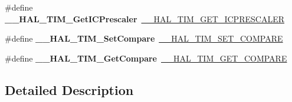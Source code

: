 \begin{DoxyCompactItemize}
\item 
\hypertarget{group___h_a_l___t_i_m___aliased___macros_gae8d82e4e04e81f7a023a45b73c9705b7}{\#define {\bfseries \-\_\-\-\_\-\-H\-A\-L\-\_\-\-T\-I\-M\-\_\-\-Get\-I\-C\-Prescaler}~\hyperlink{group___t_i_m___exported___macros_gabfeec6b3c67a5747c7dbd20aff61d8e2}{\-\_\-\-\_\-\-H\-A\-L\-\_\-\-T\-I\-M\-\_\-\-G\-E\-T\-\_\-\-I\-C\-P\-R\-E\-S\-C\-A\-L\-E\-R}}\label{group___h_a_l___t_i_m___aliased___macros_gae8d82e4e04e81f7a023a45b73c9705b7}

\item 
\hypertarget{group___h_a_l___t_i_m___aliased___macros_ga03feb77e8c86f3563d671c1ec2439e76}{\#define {\bfseries \-\_\-\-\_\-\-H\-A\-L\-\_\-\-T\-I\-M\-\_\-\-Set\-Compare}~\hyperlink{group___t_i_m___exported___macros_ga300d0c9624c3b072d3afeb7cef639b66}{\-\_\-\-\_\-\-H\-A\-L\-\_\-\-T\-I\-M\-\_\-\-S\-E\-T\-\_\-\-C\-O\-M\-P\-A\-R\-E}}\label{group___h_a_l___t_i_m___aliased___macros_ga03feb77e8c86f3563d671c1ec2439e76}

\item 
\hypertarget{group___h_a_l___t_i_m___aliased___macros_ga6c5f81acbdba730e0cd6a67f06e97de2}{\#define {\bfseries \-\_\-\-\_\-\-H\-A\-L\-\_\-\-T\-I\-M\-\_\-\-Get\-Compare}~\hyperlink{group___t_i_m___exported___macros_gaa40722f56910966e1da5241b610eed84}{\-\_\-\-\_\-\-H\-A\-L\-\_\-\-T\-I\-M\-\_\-\-G\-E\-T\-\_\-\-C\-O\-M\-P\-A\-R\-E}}\label{group___h_a_l___t_i_m___aliased___macros_ga6c5f81acbdba730e0cd6a67f06e97de2}

\end{DoxyCompactItemize}


\subsection{Detailed Description}
